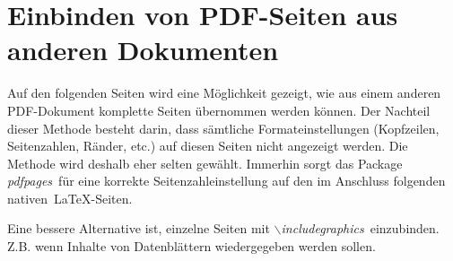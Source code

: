 \setcounter{chapter}{4}
\setcounter{section}{0}
\setcounter{table}{0}
\setcounter{figure}{0}

\section{Einbinden von PDF-Seiten aus anderen Dokumenten}

Auf den folgenden Seiten wird eine Möglichkeit gezeigt, wie aus einem anderen PDF-Dokument komplette Seiten übernommen werden können. Der Nachteil dieser Methode besteht darin, dass sämtliche Formateinstellungen (Kopfzeilen, Seitenzahlen, Ränder, etc.) auf diesen Seiten nicht angezeigt werden. Die Methode wird deshalb eher selten gewählt. Immerhin sorgt das Package \textit{\glqq pdfpages\grqq}~für eine korrekte Seitenzahleinstellung auf den im Anschluss folgenden \glqq nativen\grqq~\LaTeX-Seiten.

Eine bessere Alternative ist, einzelne Seiten mit \textit{\glqq$\backslash$includegraphics\grqq}~einzubinden. Z.B. wenn Inhalte von Datenblättern wiedergegeben werden sollen.



\fi